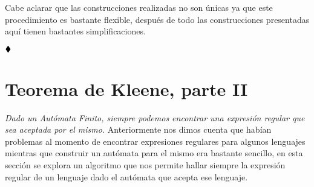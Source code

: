 \begin{itemize}
\begin{basedtikz}
     \end{basedtikz}
\end{itemize}

Cabe aclarar que las construcciones realizadas no son únicas ya que este procedimiento es bastante flexible, después de todo las construcciones presentadas aquí tienen bastantes simplificaciones.

$\hfill \blacklozenge$

\section{Teorema de Kleene, parte II}

\textit{Dado un Autómata Finito, siempre podemos encontrar una expresión regular que sea aceptada por el mismo.} Anteriormente nos dimos cuenta que habían problemas al momento de encontrar expresiones regulares para algunos lenguajes mientras que construir un autómata para el mismo era bastante sencillo, en esta sección se explora un algoritmo que nos permite hallar siempre la expresión regular de un lenguaje dado el autómata que acepta ese lenguaje.\\


